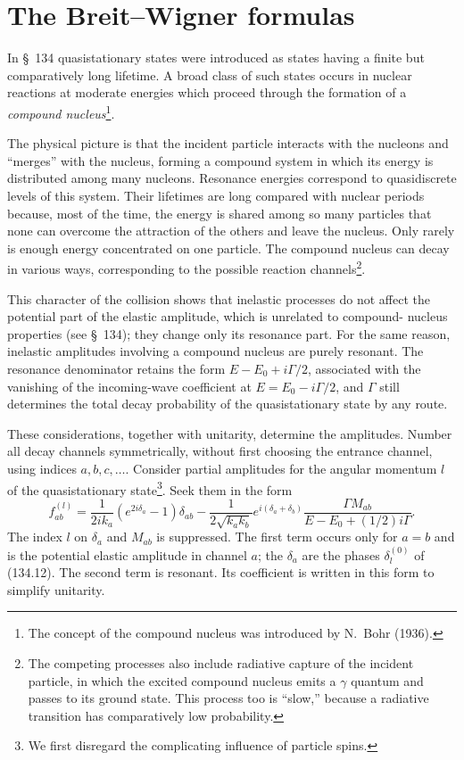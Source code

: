 \section{The Breit--Wigner formulas}

In \S~134 quasistationary states were introduced as states having a finite
but comparatively long lifetime. A broad class of such states occurs in
nuclear reactions at moderate energies which proceed through the formation
of a \emph{compound nucleus}\footnote{The concept of the compound nucleus was
introduced by N.~Bohr (1936).}.

The physical picture is that the incident particle interacts with the
nucleons and ``merges'' with the nucleus, forming a compound system in which
its energy is distributed among many nucleons. Resonance energies correspond
to quasidiscrete levels of this system. Their lifetimes are long compared
with nuclear periods because, most of the time, the energy is shared among so
many particles that none can overcome the attraction of the others and leave
the nucleus. Only rarely is enough energy concentrated on one particle. The
compound nucleus can decay in various ways, corresponding to the possible
reaction channels\footnote{The competing processes also include radiative
capture of the incident particle, in which the excited compound nucleus emits
a $\gamma$ quantum and passes to its ground state. This process too is
``slow,'' because a radiative transition has comparatively low probability.}.

This character of the collision shows that inelastic processes do not affect
the potential part of the elastic amplitude, which is unrelated to compound-
nucleus properties (see \S~134); they change only its resonance part. For the
same reason, inelastic amplitudes involving a compound nucleus are purely
resonant. The resonance denominator retains the form
$E-E_0+i\Gamma/2$, associated with the vanishing of the incoming-wave
coefficient at $E=E_0-i\Gamma/2$, and $\Gamma$ still determines the total
decay probability of the quasistationary state by any route.

These considerations, together with unitarity, determine the amplitudes.
Number all decay channels symmetrically, without first choosing the entrance
channel, using indices $a,b,c,\ldots$. Consider partial amplitudes for the
angular momentum $l$ of the quasistationary state\footnote{We first disregard
the complicating influence of particle spins.}. Seek them in the form
\begin{equation}
 f_{ab}^{(l)}=\frac1{2ik_a}(e^{2i\delta_a}-1)\delta_{ab}
 -\frac1{2\sqrt{k_ak_b}}e^{i(\delta_a+\delta_b)}
 \frac{\Gamma M_{ab}}{E-E_0+(1/2)i\Gamma}.
 \tag{145.1}
\end{equation}
The index $l$ on $\delta_a$ and $M_{ab}$ is suppressed. The first term occurs
only for $a=b$ and is the potential elastic amplitude in channel $a$; the
$\delta_a$ are the phases $\delta_l^{(0)}$ of (134.12). The second term is
resonant. Its coefficient is written in this form to simplify unitarity.


